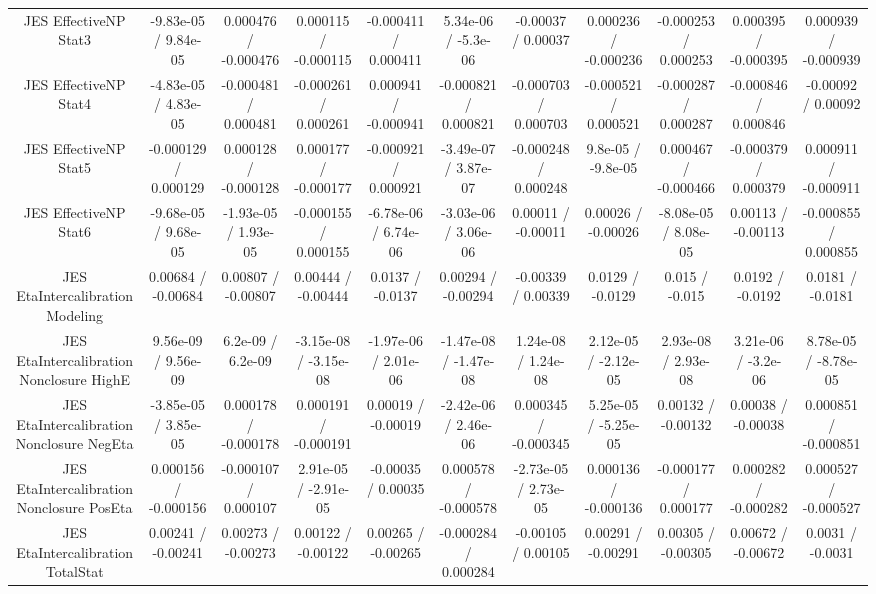 \begin{table}[htbp]
\begin{center}
\begin{tabular}{|c|c|c|c|c|c|c|c|c|c|c|}
  JES EffectiveNP Stat3 & -9.83e-05 / 9.84e-05 & 0.000476 / -0.000476 & 0.000115 / -0.000115 & -0.000411 / 0.000411 & 5.34e-06 / -5.3e-06 & -0.00037 / 0.00037 & 0.000236 / -0.000236 & -0.000253 / 0.000253 & 0.000395 / -0.000395 & 0.000939 / -0.000939 \\ 
  JES EffectiveNP Stat4 & -4.83e-05 / 4.83e-05 & -0.000481 / 0.000481 & -0.000261 / 0.000261 & 0.000941 / -0.000941 & -0.000821 / 0.000821 & -0.000703 / 0.000703 & -0.000521 / 0.000521 & -0.000287 / 0.000287 & -0.000846 / 0.000846 & -0.00092 / 0.00092 \\ 
  JES EffectiveNP Stat5 & -0.000129 / 0.000129 & 0.000128 / -0.000128 & 0.000177 / -0.000177 & -0.000921 / 0.000921 & -3.49e-07 / 3.87e-07 & -0.000248 / 0.000248 & 9.8e-05 / -9.8e-05 & 0.000467 / -0.000466 & -0.000379 / 0.000379 & 0.000911 / -0.000911 \\ 
  JES EffectiveNP Stat6 & -9.68e-05 / 9.68e-05 & -1.93e-05 / 1.93e-05 & -0.000155 / 0.000155 & -6.78e-06 / 6.74e-06 & -3.03e-06 / 3.06e-06 & 0.00011 / -0.00011 & 0.00026 / -0.00026 & -8.08e-05 / 8.08e-05 & 0.00113 / -0.00113 & -0.000855 / 0.000855 \\ 
  JES EtaIntercalibration Modeling & 0.00684 / -0.00684 & 0.00807 / -0.00807 & 0.00444 / -0.00444 & 0.0137 / -0.0137 & 0.00294 / -0.00294 & -0.00339 / 0.00339 & 0.0129 / -0.0129 & 0.015 / -0.015 & 0.0192 / -0.0192 & 0.0181 / -0.0181 \\ 
  JES EtaIntercalibration Nonclosure HighE & 9.56e-09 / 9.56e-09 & 6.2e-09 / 6.2e-09 & -3.15e-08 / -3.15e-08 & -1.97e-06 / 2.01e-06 & -1.47e-08 / -1.47e-08 & 1.24e-08 / 1.24e-08 & 2.12e-05 / -2.12e-05 & 2.93e-08 / 2.93e-08 & 3.21e-06 / -3.2e-06 & 8.78e-05 / -8.78e-05 \\ 
  JES EtaIntercalibration Nonclosure NegEta & -3.85e-05 / 3.85e-05 & 0.000178 / -0.000178 & 0.000191 / -0.000191 & 0.00019 / -0.00019 & -2.42e-06 / 2.46e-06 & 0.000345 / -0.000345 & 5.25e-05 / -5.25e-05 & 0.00132 / -0.00132 & 0.00038 / -0.00038 & 0.000851 / -0.000851 \\ 
  JES EtaIntercalibration Nonclosure PosEta & 0.000156 / -0.000156 & -0.000107 / 0.000107 & 2.91e-05 / -2.91e-05 & -0.00035 / 0.00035 & 0.000578 / -0.000578 & -2.73e-05 / 2.73e-05 & 0.000136 / -0.000136 & -0.000177 / 0.000177 & 0.000282 / -0.000282 & 0.000527 / -0.000527 \\ 
  JES EtaIntercalibration TotalStat & 0.00241 / -0.00241 & 0.00273 / -0.00273 & 0.00122 / -0.00122 & 0.00265 / -0.00265 & -0.000284 / 0.000284 & -0.00105 / 0.00105 & 0.00291 / -0.00291 & 0.00305 / -0.00305 & 0.00672 / -0.00672 & 0.0031 / -0.0031 \\ 

\end{tabular}
\end{center}
\end{table}
